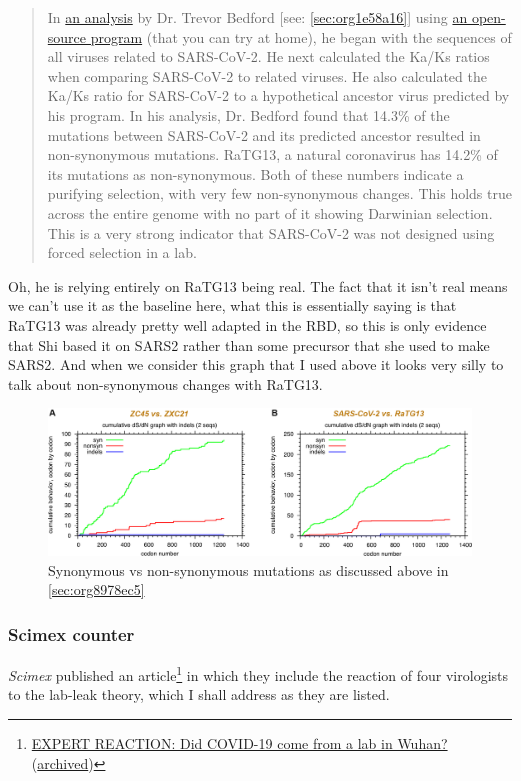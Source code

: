 \documentclass[11pt]{article}
\begin{document}
\begin{quote}
In \href{https://archive.is/1umsD}{an analysis} by Dr. Trevor Bedford [see: \ref{sec:org1e58a16}] using \href{https://github.com/blab/sars-like-cov}{an open-source program} (that you can try at home), he began with the sequences of all viruses related to SARS-CoV-2. He next calculated the Ka/Ks ratios when comparing SARS-CoV-2 to related viruses. He also calculated the Ka/Ks ratio for SARS-CoV-2 to a hypothetical ancestor virus predicted by his program. In his analysis, Dr. Bedford found that 14.3\% of the mutations between SARS-CoV-2 and its predicted ancestor resulted in non-synonymous mutations. RaTG13, a natural coronavirus has 14.2\% of its mutations as non-synonymous. Both of these numbers indicate a purifying selection, with very few non-synonymous changes. This holds true across the entire genome with no part of it showing Darwinian selection. This is a very strong indicator that SARS-CoV-2 was not designed using forced selection in a lab.
\end{quote}
Oh, he is relying entirely on RaTG13 being real. The fact that it isn't real means we can't use it as the baseline here, what this is essentially saying is that RaTG13 was already pretty well adapted in the RBD, so this is only evidence that Shi based it on SARS2 rather than some precursor that she used to make SARS2. And when we consider this graph that I used above it looks very silly to talk about non-synonymous changes with RaTG13.
\begin{figure}[htbp]
\centering
\includegraphics[width=.9\linewidth]{./images/syn-vs-nonsyn.png}
\caption{Synonymous vs non-synonymous mutations as discussed above in \ref{sec:org8978ec5}}
\end{figure}

\subsubsection{Scimex counter}
\label{sec:org890615b}
\emph{Scimex} published an article\footnote{\href{https://www.scimex.org/newsfeed/expert-reaction-did-covid-19-come-from-a-lab-in-wuhan}{EXPERT REACTION: Did COVID-19 come from a lab in Wuhan?} (\href{https://archive.is/CM9g3}{archived})} in which they include the reaction of four virologists to the lab-leak theory, which I shall address as they are listed.
\end{document}

